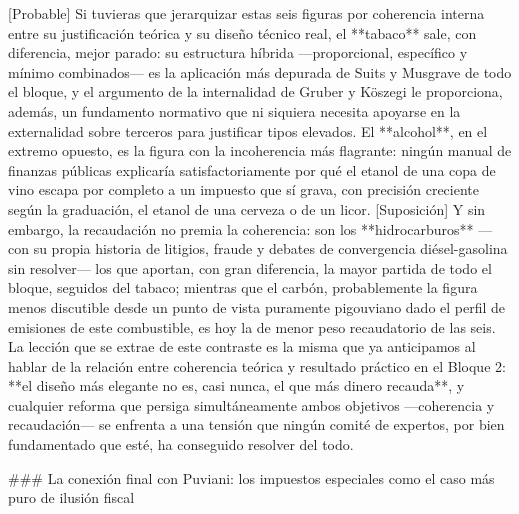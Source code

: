 \documentclass[10pt,a4paper]{article}
\begin{document}
[Probable] Si tuvieras que jerarquizar estas seis figuras por coherencia interna entre su justificación teórica y su diseño técnico real, el **tabaco** sale, con diferencia, mejor parado: su estructura híbrida —proporcional, específico y mínimo combinados— es la aplicación más depurada de Suits y Musgrave de todo el bloque, y el argumento de la internalidad de Gruber y Köszegi le proporciona, además, un fundamento normativo que ni siquiera necesita apoyarse en la externalidad sobre terceros para justificar tipos elevados. El **alcohol**, en el extremo opuesto, es la figura con la incoherencia más flagrante: ningún manual de finanzas públicas explicaría satisfactoriamente por qué el etanol de una copa de vino escapa por completo a un impuesto que sí grava, con precisión creciente según la graduación, el etanol de una cerveza o de un licor. [Suposición] Y sin embargo, la recaudación no premia la coherencia: son los **hidrocarburos** —con su propia historia de litigios, fraude y debates de convergencia diésel-gasolina sin resolver— los que aportan, con gran diferencia, la mayor partida de todo el bloque, seguidos del tabaco; mientras que el carbón, probablemente la figura menos discutible desde un punto de vista puramente pigouviano dado el perfil de emisiones de este combustible, es hoy la de menor peso recaudatorio de las seis. La lección que se extrae de este contraste es la misma que ya anticipamos al hablar de la relación entre coherencia teórica y resultado práctico en el Bloque 2: **el diseño más elegante no es, casi nunca, el que más dinero recauda**, y cualquier reforma que persiga simultáneamente ambos objetivos —coherencia y recaudación— se enfrenta a una tensión que ningún comité de expertos, por bien fundamentado que esté, ha conseguido resolver del todo.

### La conexión final con Puviani: los impuestos especiales como el caso más puro de ilusión fiscal
\end{document}
